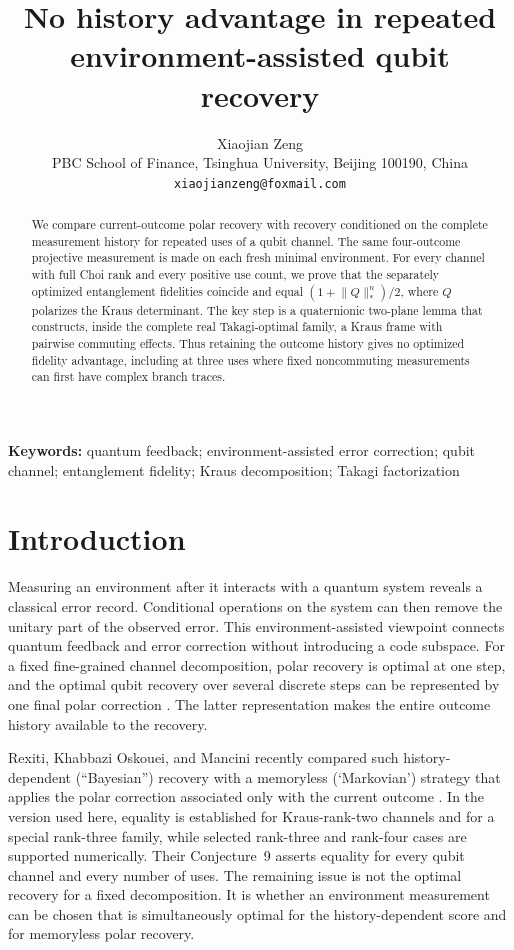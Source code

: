 \documentclass[11pt]{article}
\title{No history advantage in repeated environment-assisted qubit recovery}
\author{Xiaojian Zeng\\
\small PBC School of Finance, Tsinghua University, Beijing 100190, China\\
\small \texttt{xiaojianzeng@foxmail.com}}
\date{}
\theoremstyle{remark}
\begin{document}
\maketitle

\begin{abstract}
We compare current-outcome polar recovery with recovery conditioned on the
complete measurement history for repeated uses of a qubit channel.  The same
four-outcome projective measurement is made on each fresh minimal environment.
For every channel with full Choi rank and every positive use count, we prove
that the separately optimized entanglement fidelities coincide and equal
$(1+\lVert Q\rVert_*^n)/2$, where $Q$ polarizes the Kraus determinant.  The key
step is a quaternionic two-plane lemma that constructs, inside the complete
real Takagi-optimal family, a Kraus frame with pairwise commuting effects.
Thus retaining the outcome history gives no optimized fidelity advantage,
including at three uses where fixed noncommuting measurements can first have
complex branch traces.
\end{abstract}

\noindent\textbf{Keywords:} quantum feedback; environment-assisted error
correction; qubit channel; entanglement fidelity; Kraus decomposition; Takagi
factorization

\section{Introduction}

Measuring an environment after it interacts with a quantum system reveals a
classical error record.  Conditional operations on the system can then remove
the unitary part of the observed error.  This environment-assisted viewpoint
connects quantum feedback and error correction without introducing a code
subspace.  For a fixed fine-grained channel decomposition, polar recovery is
optimal at one step, and the optimal qubit recovery over several discrete
steps can be represented by one final polar correction
\cite{gregoratti2004}.  The latter representation makes the entire outcome
history available to the recovery.

Rexiti, Khabbazi Oskouei, and Mancini recently compared such history-dependent
(``Bayesian'') recovery with a memoryless (`Markovian') strategy that applies
the polar correction associated only with the current outcome
\cite{rexiti2024}.  In the version used here, equality is established for
Kraus-rank-two channels and for a special rank-three family, while selected
rank-three and rank-four cases are supported numerically.  Their Conjecture~9
asserts equality for every qubit channel and every number of uses.  The
remaining issue is not the optimal recovery for a fixed decomposition.  It is
whether an environment measurement can be chosen that is simultaneously
optimal for the history-dependent score and for memoryless polar recovery.
\end{document}
